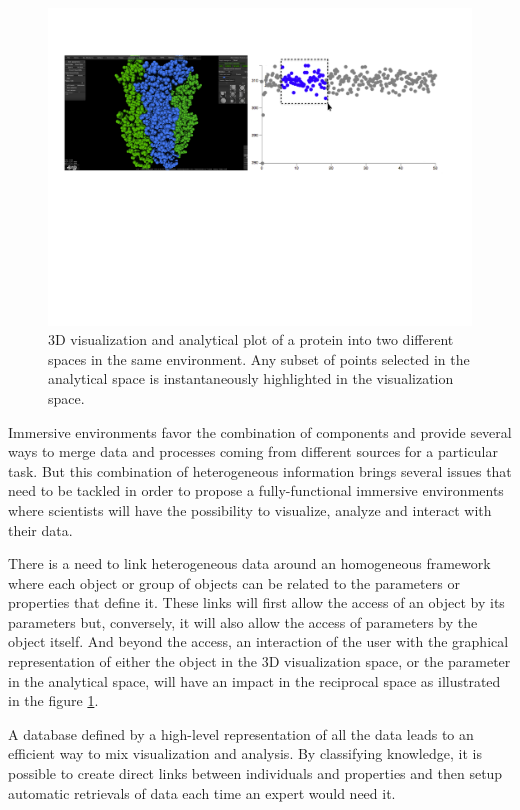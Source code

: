 \documentclass{vgtc}                          %
\begin{document}
\begin{figure}[htb]
  \centering
  \includegraphics[width=\linewidth]{figures/interactive_selection.pdf}
  \caption{3D visualization and analytical plot of a protein into two different spaces in the same environment. Any subset of points selected in the analytical space is instantaneously highlighted in the visualization space.}
  \label{interactive_selection}
\end{figure}

Immersive environments favor the combination of components and provide several ways to merge data and processes coming from different sources for a particular task. But this combination of heterogeneous information brings several issues that need to be tackled in order to propose a fully-functional immersive environments where scientists will have the possibility to visualize, analyze and interact with their data.

There is a need to link heterogeneous data around an homogeneous framework where each object or group of objects can be related to the parameters or properties that define it. These links will first allow the access of an object by its parameters but, conversely, it will also allow the access of parameters by the object itself. And beyond the access, an interaction of the user with the graphical representation of either the object in the 3D visualization space, or the parameter in the analytical space, will have an impact in the reciprocal space as illustrated in the figure \ref{interactive_selection}.

A database defined by a high-level representation of all the data leads to an efficient way to mix visualization and analysis. By classifying knowledge, it is possible to create direct links between individuals and properties and then setup automatic retrievals of data each time an expert would need it.
\end{document}
